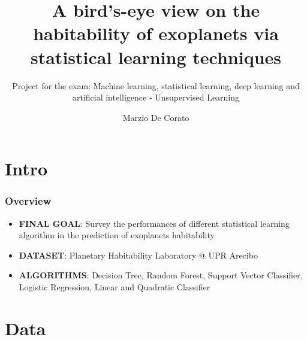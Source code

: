 \documentclass[compress]{beamer}
\title[Exoplanets survey via SL techniques]{A bird’s-eye view on the habitability of exoplanets via statistical learning techniques}
\author{Marzio De Corato}
\subtitle{Project for the exam: Machine learning, statistical
learning, deep learning and artificial intelligence - Unsupervised Learning}
\begin{document}
\frame{\titlepage}

\section{Intro}

\begin{frame}
\frametitle{Overview}
\begin{itemize}
\item\textbf{FINAL GOAL}: Survey the performances of different statistical learning algorithm in the prediction of exoplanets habitability
\item\textbf{DATASET}: Planetary Habitability Laboratory @ UPR Arecibo \cite{exoplanets-catalog}
\item\textbf{ALGORITHMS}: Decision Tree, Random Forest, Support Vector Classifier, Logistic Regression, Linear and Quadratic Classifier
\end{itemize}
\end{frame}

\section{Data}
\end{document}
